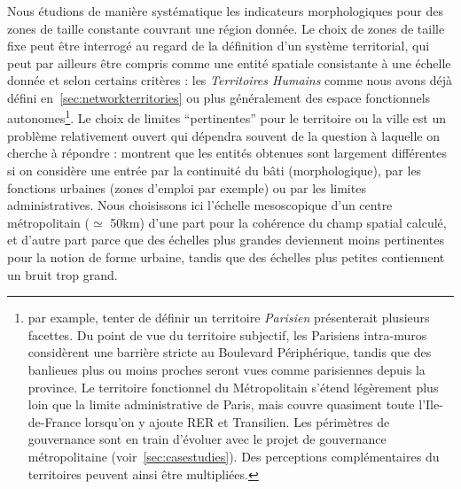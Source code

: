 {Nous étudions de manière systématique les indicateurs morphologiques pour des zones de taille constante couvrant une région donnée. Le choix de zones de taille fixe peut être interrogé au regard de la définition d'un système territorial, qui peut par ailleurs être compris comme une entité spatiale consistante à une échelle donnée et selon certains critères : les \emph{Territoires Humains} comme nous avons déjà défini en~\ref{sec:networkterritories} ou plus généralement des espace fonctionnels autonomes\footnote{par example, tenter de définir un territoire \emph{Parisien} présenterait plusieurs facettes. Du point de vue du territoire subjectif, les Parisiens intra-muros considèrent une barrière stricte au Boulevard Périphérique, tandis que des banlieues plus ou moins proches seront vues comme parisiennes depuis la province. Le territoire fonctionnel du Métropolitain s'étend légèrement plus loin que la limite administrative de Paris, mais couvre quasiment toute l'Ile-de-France lorsqu'on y ajoute RER et Transilien. Les périmètres de gouvernance sont en train d'évoluer avec le projet de gouvernance métropolitaine (voir~\ref{sec:casestudies}). Des perceptions complémentaires du territoires peuvent ainsi être multipliées.}. Le choix de limites ``pertinentes'' pour le territoire ou la ville est un problème relativement ouvert qui dépendra souvent de la question à laquelle on cherche à répondre : \cite{guerois2002commune} montrent que les entités obtenues sont largement différentes si on considère une entrée par la continuité du bâti (morphologique), par les fonctions urbaines (zones d'emploi par exemple) ou par les limites administratives. Nous choisissons ici l'échelle mesoscopique d'un centre métropolitain ($\simeq$ 50km) d'une part pour la cohérence du champ spatial calculé, et d'autre part parce que des échelles plus grandes deviennent moins pertinentes pour la notion de forme urbaine, tandis que des échelles plus petites contiennent un bruit trop grand.
}


